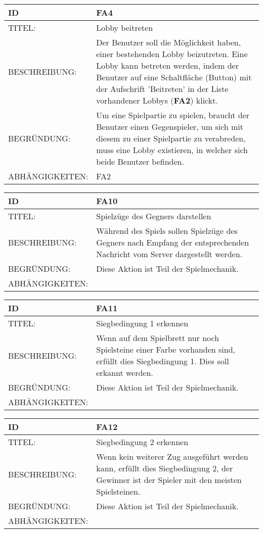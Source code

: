 \documentclass{uulm-assignment}
\begin{document}
\begin{tabularx}{16cm}{l|X}
\textbf{ID} & \textbf{FA4} \\
\hline
TITEL: & Lobby beitreten \\
\hline
BESCHREIBUNG: & Der Benutzer soll die Möglichkeit haben, einer bestehenden Lobby beizutreten.
Eine Lobby kann betreten werden, indem der Benutzer auf eine Schaltfläche (Button) mit der Aufschrift 'Beitreten' in der Liste vorhandener Lobbys (\textbf{FA2}) klickt.
\\
\hline
BEGRÜNDUNG: & Um eine Spielpartie zu spielen, braucht der Benutzer einen Gegenspieler, um sich mit diesem zu einer Spielpartie zu verabreden, muss eine Lobby existieren, in welcher sich beide Benutzer befinden. \\
\hline
ABHÄNGIGKEITEN: & FA2\\
\end{tabularx}

\begin{tabularx}{16cm}{l|X}
\textbf{ID} & \textbf{FA10} \\
\hline
TITEL: & Spielzüge des Gegners darstellen \\
\hline
BESCHREIBUNG: & Während des Spiels sollen Spielzüge des Gegners nach Empfang der entsprechenden Nachricht vom Server dargestellt werden.
\\
\hline
BEGRÜNDUNG: & Diese Aktion ist Teil der Spielmechanik. \\
\hline
ABHÄNGIGKEITEN: & \\
\end{tabularx}

\begin{tabularx}{16cm}{l|X}
\textbf{ID} & \textbf{FA11} \\
\hline
TITEL: & Siegbedingung 1 erkennen \\
\hline
BESCHREIBUNG: & Wenn auf dem Spielbrett nur noch Spielsteine einer Farbe vorhanden sind, erfüllt dies Siegbedingung 1. Dies soll erkannt werden.
\\
\hline
BEGRÜNDUNG: & Diese Aktion ist Teil der Spielmechanik. \\
\hline
ABHÄNGIGKEITEN: & \\
\end{tabularx}


\begin{tabularx}{16cm}{l|X}
\textbf{ID} & \textbf{FA12} \\
\hline
TITEL: & Siegbedingung 2 erkennen \\
\hline
BESCHREIBUNG: & Wenn kein weiterer Zug ausgeführt werden kann, erfüllt dies Siegbedingung 2, der Gewinner ist der Spieler mit den meisten Spielsteinen.
\\
\hline
BEGRÜNDUNG: & Diese Aktion ist Teil der Spielmechanik. \\
\hline
ABHÄNGIGKEITEN: & \\
\end{tabularx}
\end{document}
